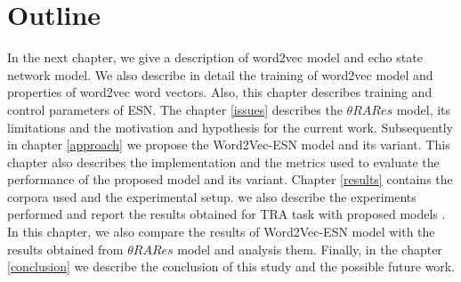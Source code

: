 \section{Outline}

In the next chapter, we give a description of  word2vec model and echo state network model. We also describe in detail the training of word2vec model and properties of word2vec word vectors. Also, this chapter describes training and control parameters of ESN. The chapter \ref{issues} describes the  $\theta RARes$ model, its limitations and the motivation and hypothesis for the current work. Subsequently in chapter \ref{approach} we propose the Word2Vec-ESN model and its variant. This chapter also describes the implementation and the metrics used to evaluate the performance of the proposed model and its variant. Chapter \ref{results} contains the corpora used and the experimental setup. we also describe  the experiments  performed and report the results obtained for TRA task with proposed models . In this chapter, we also compare the results of Word2Vec-ESN model with the results obtained from  $\theta RARes$ model and analysis them. Finally, in the chapter \ref{conclusion} we describe the conclusion of this study and the possible future work.